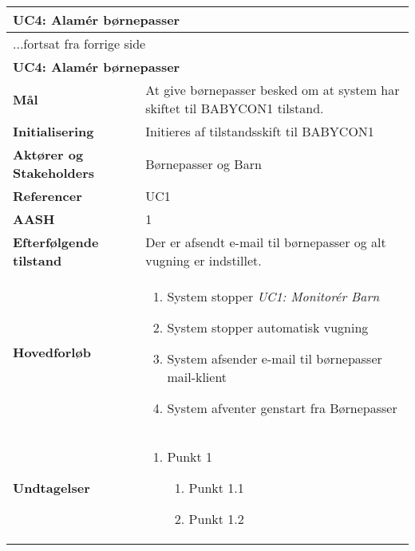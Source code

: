 \begin{center} \centering \label{kravspec:uc4}
	\begin{longtable}{|p{5cm}|p{9cm}|}  %
	\hline
		\multicolumn{2}{|l|}{\textbf{UC4: Alamér børnepasser}} \\\hline %
		\endfirsthead
		
		\multicolumn{2}{l}{...fortsat fra forrige side} \\ \hline %
		\multicolumn{2}{|l|}{\textbf{UC4: Alamér børnepasser}} \\\hline %
		\endhead	
		
		\textbf{Mål}							&At give børnepasser besked om at system har skiftet til BABYCON1 tilstand.		\\\hline
		\textbf{Initialisering}				&Initieres af tilstandsskift til BABYCON1		\\\hline
		\textbf{Aktører og Stakeholders}		&Børnepasser og Barn		\\\hline 
		\textbf{Referencer}					&UC1		\\\hline
		\textbf{AASH}						&1		\\\hline
		\textbf{Efterfølgende tilstand}		&Der er afsendt e-mail til børnepasser og alt vugning er indstillet. 		\\\hline
		\textbf{Hovedforløb}					
			&\begin{enumerate}
				
				\item System stopper \textit{UC1: Monitorér Barn}
				\item \label{kravspec:Automatisk_vugning}System stopper automatisk vugning
				\newline [Und: \ref{kravspec:Automatisk_vugning}.a Manuel vugning stoppes] 				
				
				\item \label{kravspec:Email_afsendelse}System afsender e-mail til børnepasser mail-klient
				\newline [Und: \ref{kravspec:Email_afsendelse}.a E-mail kunne ikke afsendes] 
				\item System afventer genstart fra Børnepasser
				
			\end{enumerate}
		\\\hline
		\textbf{Undtagelser}
			&\begin{enumerate}
			
			\item Punkt 1
					\begin{enumerate}
			
					\item Punkt 1.1
					\item Punkt 1.2
					 
					\end{enumerate}

			\end{enumerate}
		\\\hline
	\end{longtable} 
\end{center}

